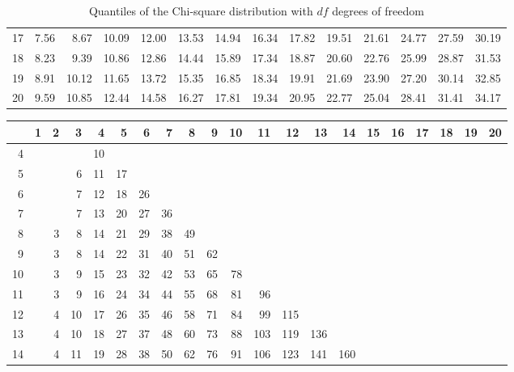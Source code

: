 \begin{table}[!ht]
\begin{tabular}{@{}r@{~~}r@{~~}r@{~~}r@{~~}r@{~~}r@{~~}r@{~~}r@{~~}r@{~~}r@{~~}r@{~~}r@{~~}r@{~~}r@{}}
  17 & 7.56 & 8.67 & 10.09 & 12.00 & 13.53 & 14.94 & 16.34 & 17.82 & 19.51 & 21.61 & 24.77 & 27.59 & 30.19 \\ 
  18 & 8.23 & 9.39 & 10.86 & 12.86 & 14.44 & 15.89 & 17.34 & 18.87 & 20.60 & 22.76 & 25.99 & 28.87 & 31.53 \\ 
  19 & 8.91 & 10.12 & 11.65 & 13.72 & 15.35 & 16.85 & 18.34 & 19.91 & 21.69 & 23.90 & 27.20 & 30.14 & 32.85 \\ 
  20 & 9.59 & 10.85 & 12.44 & 14.58 & 16.27 & 17.81 & 19.34 & 20.95 & 22.77 & 25.04 & 28.41 & 31.41 & 34.17 \\ 
   \hline
\end{tabular}
\caption{Quantiles of the Chi-square distribution with $df$ degrees of freedom} 
\end{table}

\begin{table}[ht]
\centering
\begin{tabular}{@{}r@{~~}r@{~~}r@{~~}r@{~~}r@{~~}r@{~~}r@{~~}r@{~~}r@{~~}r@{~~}r@{~~}r@{~~}r@{~~}r@{~~}r@{~~}r@{~~}r@{~~}r@{~~}r@{~~}r@{~~}r@{}}
  \hline
 & 1 & 2 & 3 & 4 & 5 & 6 & 7 & 8 & 9 & 10 & 11 & 12 & 13 & 14 & 15 & 16 & 17 & 18 & 19 & 20 \\ 
  \hline
  4 &  &  &  & 10 &  &  &  &  &  &  &  &  &  &  &  &  &  &  &  &  \\ 
  5 &  &  & 6 & 11 & 17 &  &  &  &  &  &  &  &  &  &  &  &  &  &  &  \\ 
  6 &  &  & 7 & 12 & 18 & 26 &  &  &  &  &  &  &  &  &  &  &  &  &  &  \\ 
  7 &  &  & 7 & 13 & 20 & 27 & 36 &  &  &  &  &  &  &  &  &  &  &  &  &  \\ 
  8 &  & 3 & 8 & 14 & 21 & 29 & 38 & 49 &  &  &  &  &  &  &  &  &  &  &  &  \\ 
  9 &  & 3 & 8 & 14 & 22 & 31 & 40 & 51 & 62 &  &  &  &  &  &  &  &  &  &  &  \\ 
  10 &  & 3 & 9 & 15 & 23 & 32 & 42 & 53 & 65 & 78 &  &  &  &  &  &  &  &  &  &  \\ 
  11 &  & 3 & 9 & 16 & 24 & 34 & 44 & 55 & 68 & 81 & 96 &  &  &  &  &  &  &  &  &  \\ 
  12 &  & 4 & 10 & 17 & 26 & 35 & 46 & 58 & 71 & 84 & 99 & 115 &  &  &  &  &  &  &  &  \\ 
  13 &  & 4 & 10 & 18 & 27 & 37 & 48 & 60 & 73 & 88 & 103 & 119 & 136 &  &  &  &  &  &  &  \\ 
  14 &  & 4 & 11 & 19 & 28 & 38 & 50 & 62 & 76 & 91 & 106 & 123 & 141 & 160 &  &  &  &  &  &  \\ 

\end{tabular}
\end{table}
